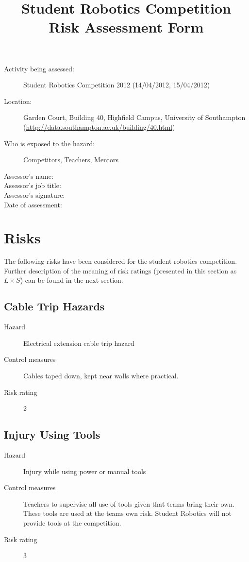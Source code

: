 \documentclass[12pt,a4paper]{scrartcl}
\title{Student Robotics Competition Risk Assessment Form}
\begin{document}
\maketitle

\begin{description}
\item[Activity being assessed:] Student Robotics Competition 2012 (14/04/2012, 15/04/2012)
\item[Location:] Garden Court, Building 40, Highfield Campus, University of Southampton (\url{http://data.southampton.ac.uk/building/40.html})
\item[Who is exposed to the hazard:] Competitors, Teachers, Mentors
\end{description}

\begin{description}
\item[Assessor's name:]
\item[Assessor's job title:]
\item[Assessor's signature:]
\item[Date of assessment:]
\end{description}
\clearpage

\newcommand{\risk}[4]{
\subsection{#1}
\begin{description}
  \item[Hazard] #2
  \item[Control measures] #3
  \item[Risk rating] #4
\end{description}
}

\section{Risks}
The following risks have been considered for the student robotics competition.  Further description of the meaning of risk ratings (presented in this section as $L \times S$) can be found in the next section.

\risk{Cable Trip Hazards}
{Electrical extension cable trip hazard}
{Cables taped down, kept near walls where practical.}
{2}

\risk{Injury Using Tools}
{Injury while using power or manual tools}
{Teachers to supervise all use of tools given that teams bring their own. These tools are used at the teams own risk. Student Robotics will not provide tools at the competition.}
{3}
\end{document}
